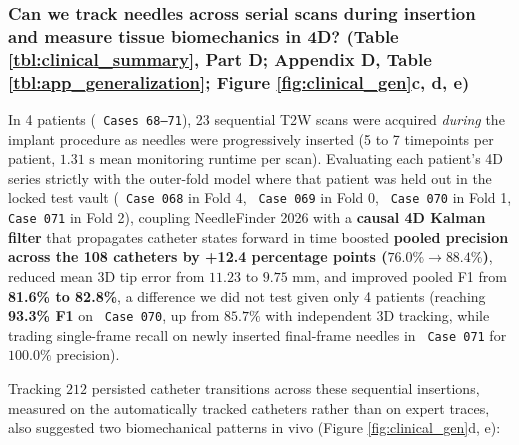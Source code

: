 \documentclass[
  11pt,
]{article}
\let\nforigtexttt\texttt
\renewcommand{\texttt}[1]{\nforigtexttt{\XeTeXinterchartokenstate=1 #1}}
\begin{document}
\subsubsection{\texorpdfstring{Can we track needles across serial scans
during insertion and measure tissue biomechanics in 4D? (Table
\ref{tbl:clinical_summary}, Part D; Appendix D, Table
\ref{tbl:app_generalization}; Figure \ref{fig:clinical_gen}c, d,
e)}{Can we track needles across serial scans during insertion and measure tissue biomechanics in 4D? (Table , Part D; Appendix D, Table ; Figure c, d, e)}}\label{can-we-track-needles-across-serial-scans-during-insertion-and-measure-tissue-biomechanics-in-4d-table-part-d-appendix-d-table-figure-c-d-e}

In 4 patients (\texttt{Cases\ 68–71}), 23 sequential T2W scans were
acquired \emph{during} the implant procedure as needles were
progressively inserted (5 to 7 timepoints per patient, \(1.31\text{ s}\)
mean monitoring runtime per scan). Evaluating each patient's 4D series
strictly with the outer-fold model where that patient was held out in
the locked test vault (\texttt{Case\ 068} in Fold 4, \texttt{Case\ 069}
in Fold 0, \texttt{Case\ 070} in Fold 1, \texttt{Case\ 071} in Fold 2),
coupling NeedleFinder 2026 with a \textbf{causal 4D Kalman filter} that
propagates catheter states forward in time boosted \textbf{pooled
precision across the 108 catheters by +12.4 percentage points
(\(76.0\% \to 88.4\%\))}, reduced mean 3D tip error from
\(11.23\text{ to }9.75\text{ mm}\), and improved pooled F1 from
\textbf{81.6\% to 82.8\%}, a difference we did not test given only 4
patients (reaching \textbf{93.3\% F1} on \texttt{Case\ 070}, up from
\(85.7\%\) with independent 3D tracking, while trading single-frame
recall on newly inserted final-frame needles in \texttt{Case\ 071} for
\(100.0\%\) precision).

Tracking \(212\) persisted catheter transitions across these sequential
insertions, measured on the automatically tracked catheters rather than
on expert traces, also suggested two biomechanical patterns in vivo
(Figure \ref{fig:clinical_gen}d, e):
\end{document}
